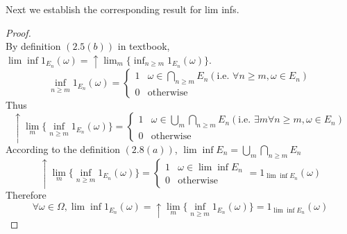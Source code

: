 \documentclass{article}
\begin{document}
Next we establish the corresponding result for lim infs.

\begin{proof}\label{pf2}
    $~$\\
    By definition $(2.5(b))$ in textbook, $\lim\inf1_{E_n}(\omega)=\uparrow\lim_m \{\inf_{n\geq m}1_{E_n}(\omega)\}$.
    \begin{equation}
        \inf_{n\geq m}1_{E_n}(\omega)
        =
        \left\{
        \begin{array}{rl}
            1 & \omega\in\bigcap_{n\geq m}E_n(\text{i.e. }\forall n\geq m, \omega\in E_n) \\
            0 & \text{otherwise}
        \end{array}
        \right.
    \end{equation}
    Thus
    \begin{equation}
        \uparrow\lim_m \{\inf_{n\geq m}1_{E_n}(\omega)\}
        =
        \left\{
        \begin{array}{rl}
            1 & \omega\in\bigcup_{m}\bigcap_{n\geq m}E_n(\text{i.e. } \exists m \forall n\geq m, \omega\in E_n) \\
            0 & \text{otherwise}
        \end{array}
        \right.
    \end{equation}
    According to the definition $(2.8(a))$, $\lim\inf E_n=\bigcup_m\bigcap_{n\geq m}E_n$
    \begin{equation}
        \uparrow\lim_m \{\inf_{n\geq m}1_{E_n}(\omega)\}
        =
        \left\{
        \begin{array}{rl}
            1 & \omega\in\lim\inf E_n \\
            0 & \text{otherwise}
        \end{array}=1_{\lim \inf E_n}(\omega)
        \right.
    \end{equation}
    Therefore
    $$\forall \omega\in \Omega, \lim\inf1_{E_n}(\omega)=\uparrow\lim_m \{\inf_{n\geq m}1_{E_n}(\omega)\}=1_{\lim \inf E_n}(\omega)$$
\end{proof}
\end{document}
